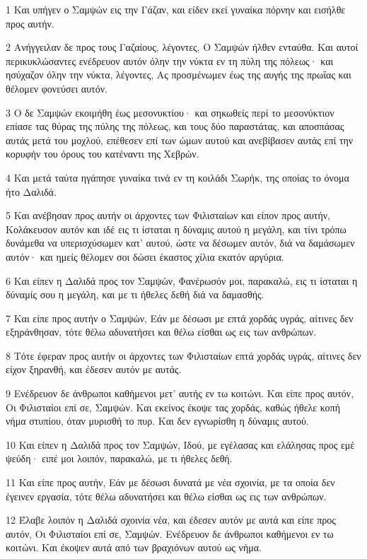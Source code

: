 \par 1 Και υπήγεν ο Σαμψών εις την Γάζαν, και είδεν εκεί γυναίκα πόρνην και εισήλθε προς αυτήν.
\par 2 Ανήγγειλαν δε προς τους Γαζαίους, λέγοντες, Ο Σαμψών ήλθεν ενταύθα. Και αυτοί περικυκλώσαντες ενέδρευον αυτόν όλην την νύκτα εν τη πύλη της πόλεως· και ησύχαζον όλην την νύκτα, λέγοντες, Ας προσμένωμεν έως της αυγής της πρωΐας και θέλομεν φονεύσει αυτόν.
\par 3 Ο δε Σαμψών εκοιμήθη έως μεσονυκτίου· και σηκωθείς περί το μεσονύκτιον επίασε τας θύρας της πύλης της πόλεως, και τους δύο παραστάτας, και αποσπάσας αυτάς μετά του μοχλού, επέθεσεν επί των ώμων αυτού και ανεβίβασεν αυτάς επί την κορυφήν του όρους του κατέναντι της Χεβρών.
\par 4 Και μετά ταύτα ηγάπησε γυναίκα τινά εν τη κοιλάδι Σωρήκ, της οποίας το όνομα ήτο Δαλιδά.
\par 5 Και ανέβησαν προς αυτήν οι άρχοντες των Φιλισταίων και είπον προς αυτήν, Κολάκευσον αυτόν και ιδέ εις τι ίσταται η δύναμις αυτού η μεγάλη, και τίνι τρόπω δυνάμεθα να υπερισχύσωμεν κατ' αυτού, ώστε να δέσωμεν αυτόν, διά να δαμάσωμεν αυτόν· και ημείς θέλομεν σοι δώσει έκαστος χίλια εκατόν αργύρια.
\par 6 Και είπεν η Δαλιδά προς τον Σαμψών, Φανέρωσόν μοι, παρακαλώ, εις τι ίσταται η δύναμίς σου η μεγάλη, και με τι ήθελες δεθή διά να δαμασθής.
\par 7 Και είπε προς αυτήν ο Σαμψών, Εάν με δέσωσι με επτά χορδάς υγράς, αίτινες δεν εξηράνθησαν, τότε θέλω αδυνατήσει και θέλω είσθαι ως εις των ανθρώπων.
\par 8 Τότε έφεραν προς αυτήν οι άρχοντες των Φιλισταίων επτά χορδάς υγράς, αίτινες δεν είχον ξηρανθή, και έδεσεν αυτόν με αυτάς.
\par 9 Ενέδρευον δε άνθρωποι καθήμενοι μετ' αυτής εν τω κοιτώνι. Και είπε προς αυτόν, Οι Φιλισταίοι επί σε, Σαμψών. Και εκείνος έκοψε τας χορδάς, καθώς ήθελε κοπή νήμα στυπίου, όταν μυρισθή το πυρ. Και δεν εγνωρίσθη η δύναμις αυτού.
\par 10 Και είπεν η Δαλιδά προς τον Σαμψών, Ιδού, με εγέλασας και ελάλησας προς εμέ ψεύδη· ειπέ μοι λοιπόν, παρακαλώ, με τι ήθελες δεθή.
\par 11 Και είπε προς αυτήν, Εάν με δέσωσι δυνατά με νέα σχοινία, με τα οποία δεν έγεινεν εργασία, τότε θέλω αδυνατήσει και θέλω είσθαι ως εις των ανθρώπων.
\par 12 Έλαβε λοιπόν η Δαλιδά σχοινία νέα, και έδεσεν αυτόν με αυτά και είπε προς αυτόν, Οι Φιλισταίοι επί σε, Σαμψών. Ενέδρευον δε άνθρωποι καθήμενοι εν τω κοιτώνι. Και έκοψεν αυτά από των βραχιόνων αυτού ως νήμα.
